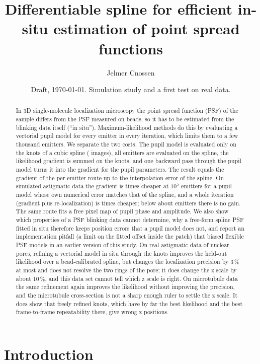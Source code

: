 \documentclass[11pt,a4paper]{article}
\title{Differentiable spline for efficient in-situ estimation of point spread functions}
\author{Jelmer Cnossen}
\date{Draft, \today. Simulation study and a first test on real data.}
\begin{document}
\maketitle

\begin{abstract}
In 3D single-molecule localization microscopy the point spread function (PSF) of the sample differs from the PSF
measured on beads, so it has to be estimated from the blinking data itself (``in situ''). Maximum-likelihood
methods do this by evaluating a vectorial pupil model for every emitter in every iteration, which limits them to
a few thousand emitters. We separate the two costs. The pupil model is evaluated only on the knots of a cubic
spline (\nknotimg{} images), all emitters are evaluated on the spline, the likelihood gradient is summed on the
knots, and one backward pass through the pupil model turns it into the gradient for the pupil parameters. The
result equals the gradient of the per-emitter route up to the interpolation error of the spline. On simulated
astigmatic data the gradient is \gradspeedA{} times cheaper at $10^5$ emitters for a pupil model whose own
numerical error matches that of the spline, and a whole iteration (gradient plus re-localization) is
\iterspeedA{} times cheaper; below about \breakevenA{} emitters there is no gain. The same route fits a free
pixel map of pupil phase and amplitude. We also show which properties of a PSF blinking data cannot determine,
why a free-form spline PSF fitted in situ therefore keeps position errors that a pupil model does not, and
report an implementation pitfall (a limit on the fitted offset inside the patch) that biased flexible PSF models
in an earlier version of this study. On real astigmatic data of nuclear pores, refining a vectorial model in
situ through the knots improves the held-out likelihood over a bead-calibrated spline, but changes the
localization precision by 3\,\% at most and does not resolve the two rings of the pore; it does change the z
scale by about 10\,\%, and this data set cannot tell which z scale is right. On microtubule data the same
refinement again improves the likelihood without improving the precision, and the microtubule cross-section is
not a sharp enough ruler to settle the z scale. It does show that freely refined knots, which have by far the
best likelihood and the best frame-to-frame repeatability there, give wrong z positions.
\end{abstract}

\section{Introduction}
\end{document}
